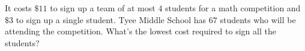 It costs $\$11$ to sign up a team of at most $4$ students for a math competition and $\$3$ to sign up a single student. Tyee Middle School has $67$ students who will be attending the competition. What's the lowest cost required to sign all the students?
